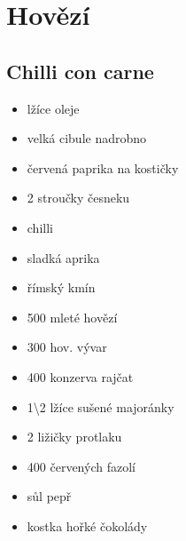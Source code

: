 \documentclass[10pt,a4paper]{article}
\newenvironment{myitemize}
{ \begin{itemize}
    \setlength{\itemsep}{0pt}
    \setlength{\parskip}{0pt}
    \setlength{\parsep}{0pt}     }
{ \end{itemize}                  }
\begin{document}
\section{Hovězí}
\subsection{Chilli con carne}
\begin{minipage}[t]{0,5\textwidth}
\begin{myitemize} 
\item lžíce oleje
\item velká cibule nadrobno
\item červená paprika na kostičky
\item 2 stroučky česneku
\item chilli 
\item sladká aprika
\item římský kmín
\item 500 mleté hovězí
\item 300 hov. vývar
\item 400 konzerva rajčat
\item 1\textbackslash 2 lžíce sušené majoránky
\item 2 ližičky protlaku
\item 400 červených fazolí
\item sůl pepř
\item kostka hořké čokolády
\end{myitemize}
\end{minipage}
\begin{minipage}[t]{0,5\textwidth}

\end{minipage}
\end{document}
